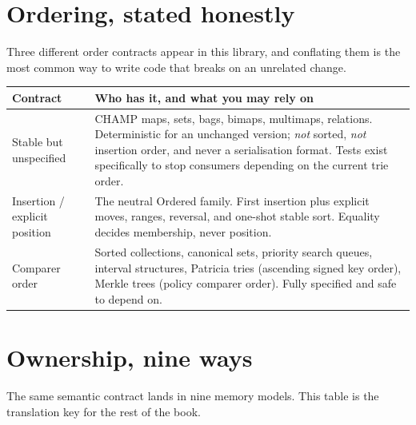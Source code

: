 \documentclass[11pt,twoside,openright]{book}
\makeatletter
\newenvironment{d7table}[1]
  {\par\vspace{3pt}\small
   \setlength{\LTpre}{4pt}\setlength{\LTpost}{4pt}
   \begin{longtable}{@{}%
     >{\raggedright\arraybackslash}p{#1\textwidth}%
     @{\hspace{10pt}}%
     >{\raggedright\arraybackslash}p{\dimexpr\textwidth-#1\textwidth-10pt\relax}@{}}}
  {\end{longtable}}
\newcommand{\thead}[1]{\sffamily\bfseries\footnotesize\color{d7ink}#1}
\makeatother
\begin{document}
\section{Ordering, stated honestly}

Three different order contracts appear in this library, and conflating them is
the most common way to write code that breaks on an unrelated change.

\begin{d7table}{0.24}
\toprule
\thead{Contract} & \thead{Who has it, and what you may rely on} \\
\midrule
Stable but unspecified & CHAMP maps, sets, bags, bimaps, multimaps, relations.
Deterministic for an unchanged version; \emph{not} sorted, \emph{not} insertion
order, and never a serialisation format. Tests exist specifically to stop
consumers depending on the current trie order. \\
Insertion / explicit position & The neutral Ordered family. First insertion
plus explicit moves, ranges, reversal, and one-shot stable sort. Equality decides
membership, never position. \\
Comparer order & Sorted collections, canonical sets, priority search queues,
interval structures, Patricia tries (ascending signed key order), Merkle trees
(policy comparer order). Fully specified and safe to depend on. \\
\bottomrule
\end{d7table}

\section{Ownership, nine ways}

The same semantic contract lands in nine memory models. This table is the
translation key for the rest of the book.
\end{document}
